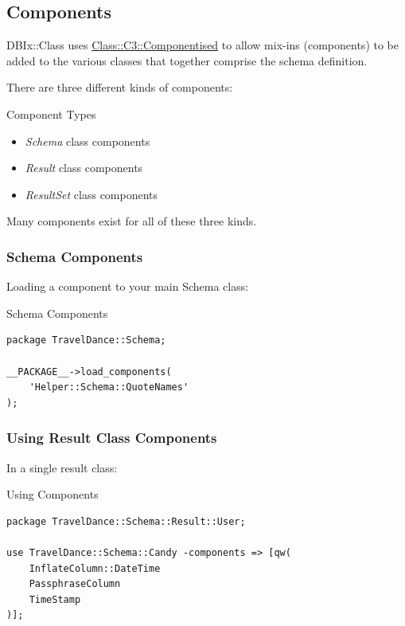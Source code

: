 \subsection{Components}
DBIx::Class uses \href{https://metacpan.org/pod/Class::C3::Componentised}
{Class::C3::Componentised} to allow mix-ins (components) to be added to the 
various classes that together comprise the schema definition. 

There are three different kinds of components:

\begin{frame}{Component Types}
\begin{itemize}
\item \emph{Schema} class components
\item \emph{Result} class components
\item \emph{ResultSet} class components
\end{itemize}
\end{frame}
 
Many components exist for all of these three kinds.

\subsubsection{Schema Components}

Loading a component to your main Schema class:

\begin{frame}[fragile]{Schema Components}
\begin{lstlisting}
package TravelDance::Schema;
 
__PACKAGE__->load_components(
    'Helper::Schema::QuoteNames'
);
\end{lstlisting}
\end{frame}

\subsubsection{Using Result Class Components}

In a single result class:

\begin{frame}[fragile]{Using Components}
\begin{lstlisting}
package TravelDance::Schema::Result::User;

use TravelDance::Schema::Candy -components => [qw(
    InflateColumn::DateTime 
    PassphraseColumn
    TimeStamp
)];
\end{lstlisting}
\end{frame}

